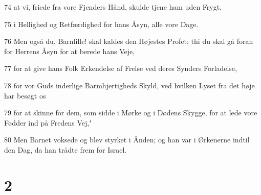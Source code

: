 \par 74 at vi, friede fra vore Fjenders Hånd, skulde tjene ham uden Frygt,
\par 75 i Hellighed og Retfærdighed for hans Åsyn, alle vore Dage.
\par 76 Men også du, Barnlille! skal kaldes den Højestes Profet; thi du skal gå foran for Herrens Åsyn for at berede hans Veje,
\par 77 for at give hans Folk Erkendelse af Frelse ved deres Synders Forladelse,
\par 78 for vor Guds inderlige Barmhjertigheds Skyld, ved hvilken Lyset fra det høje har besøgt os
\par 79 for at skinne for dem, som sidde i Mørke og i Dødens Skygge, for at lede vore Fødder ind på Fredens Vej,"
\par 80 Men Barnet voksede og blev styrket i Ånden; og han var i Ørkenerne indtil den Dag, da han trådte frem for Israel.

\chapter{2}


